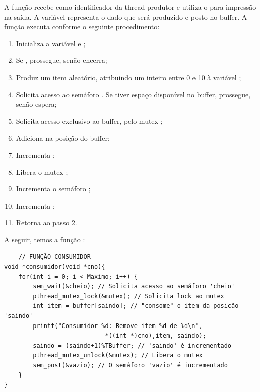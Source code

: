 \documentclass[
	12pt,				%
	openright,			%
	oneside,			%
	a4paper,			%
	chapter=TITLE,		%
	english,			%
	french,				%
	spanish,			%
	brazil				%
	]{abntex2}
\theoremstyle{definition}
\begin{document}
A função  recebe  como identificador da thread produtor e utiliza-o para impressão na saída. A variável   representa o dado que será produzido e posto no buffer. A função executa conforme o seguinte procedimento:

\begin{enumerate}
    \item Inicializa a variável  e ;
    \item Se , prossegue, senão encerra;
    \item Produz um item aleatório, atribuindo um inteiro entre 0 e 10 à variável ;
    \item Solicita acesso ao semáforo . Se tiver espaço disponível no buffer, prossegue, senão espera;
    \item Solicita acesso exclusivo ao buffer, pelo mutex ;
    \item Adiciona  na posição  do buffer;
    \item Incrementa ;
    \item Libera o mutex ;
    \item Incrementa o semáforo ;
    \item Incrementa ;
    \item Retorna ao passo 2.
\end{enumerate}

A seguir, temos a função :

\begin{verbatim}
    // FUNÇÃO CONSUMIDOR
void *consumidor(void *cno){
    for(int i = 0; i < Maximo; i++) {
        sem_wait(&cheio); // Solicita acesso ao semáforo 'cheio'
        pthread_mutex_lock(&mutex); // Solicita lock ao mutex 
        int item = buffer[saindo]; // "consome" o item da posição 'saindo' 
        printf("Consumidor %d: Remove item %d de %d\n",
                            *((int *)cno),item, saindo);
        saindo = (saindo+1)%TBuffer; // 'saindo' é incrementado 
        pthread_mutex_unlock(&mutex); // Libera o mutex
        sem_post(&vazio); // O semáforo 'vazio' é incrementado
    }
}
\end{verbatim}
\end{document}
